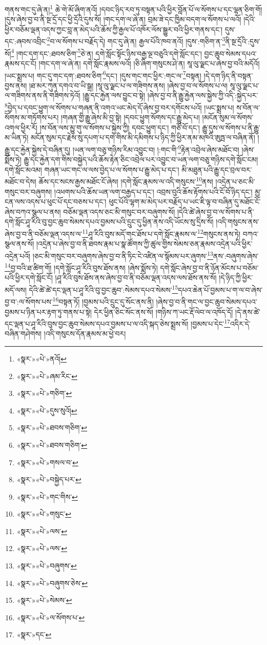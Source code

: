 གནས་གང་དུ་ཞེ་ན།\footnote{«སྣར་»«པེ་»ནའོ།} ཆེ་གེ་མོ་ཞིག་ནའོ། །དབང་ཉིད་རབ་ཏུ་བསྟན་པའི་ཕྱིར་བློན་པོ་ལ་སོགས་པ་དང་ལྷན་ཅིག་གོ། །དུས་ཞེས་བྱ་བ་ནི་སྔ་དྲོ་དང་ཕྱི་དྲོའི་དུས་སོ། །གང་དག་ལ་ཞེ་ན། བྲམ་ཟེ་དང་ཁྱིམ་བདག་ལ་སོགས་པ་ལའོ། །དེའི་ཕྱིར་བཅོམ་ལྡན་འདས་ཀྱང་བླ་ན་མེད་པའི་ཆོས་ཀྱི་རྒྱལ་པོ་འཁོར་ལོས་སྒྱུར་བའི་ཕྱིར་གནས་དང་། དུས་དང་:ཞབས་འབྲིང་\footnote{«སྣར་»«པེ་»ཞམ་རིང་}བ་ལ་སོགས་པ་བརྗོད་དེ། གང་དུ་ཞེ་ན། རྒྱལ་པོའི་ཁབ་ནའོ། །དུས་:གཅིག་ན་\footnote{«སྣར་»«པེ་»གཅིག་}ནི་སྔ་དྲོའི་:དུས་སོ།\footnote{«སྣར་»«པེ་»དུས་སུའོ།} །གང་དག་དང་:ཐབས་ཅིག་\footnote{«སྣར་»«པེ་»ཐབས་གཅིག་}ཅེ་ན། དགེ་སློང་སྟོང་ཉིས་བརྒྱ་ལྔ་བཅུའི་དགེ་སློང་དང་། བྱང་ཆུབ་སེམས་དཔའ་རྣམས་དང་ངོ། །གང་དག་ལ་ཞེ་ན། དགེ་སློང་རྣམས་ལའོ། །ཅི་ཞིག་གསུངས་ཤེ་ན། སཱ་ལུ་ལྗང་པ་ཞེས་བྱ་བའི་མདོའོ། །ཡང་སྨྲས་པ། གང་དུ་གང་དག་:ཐབས་ཅིག་\footnote{«སྣར་»«པེ་»ཐབས་གཅིག་}དང་། །དུས་གང་གང་ཕྱིར་:གང་ལ་\footnote{«སྣར་»«པེ་»གསལ་བ་}བསྟན། །དེ་དག་ཉིད་ནི་བསྟན་བྱས་ནས། །ཐ་མར་ཀུན་དགའ་བ་ཡི་སྒྲ། །སཱ་ལུ་ལྗང་པ་ལ་གཟིགས་ནས། །ཞེས་བྱ་བ་ལ་སོགས་པ་ལ། སཱ་ལུ་ལྗང་པ་ལ་གཟིགས་ནས་ནི་གཟིགས་ཏེའོ། །རྒྱུ་དང་རྐྱེན་ལས་བྱུང་བ་སྟེ། །ཞེས་བྱ་བ་ནི་རྒྱུ་རྐྱེན་ལས་སྐྱེས་ཀྱི་འདི་:སྐྱེད་པར་\footnote{«སྣར་»«པེ་»བསྐྱེད་པར་}བྱེད་པ་དབང་ཕྱུག་ལ་སོགས་པ་གཞན་ནི་འགའ་ཡང་མེད་དོ་ཞེས་བྱ་བར་དགོངས་པའོ། །ཡང་སྨྲས་པ། ས་བོན་ལ་སོགས་མ་གཏོགས་པར། །གཞན་གྱི་རྒྱུ་ཞེས་མི་བྱ་སྟེ། །དབང་ཕྱུག་སོགས་དང་རྒྱུ་མེད་པ། །མངོན་སུམ་ལ་སོགས་འགལ་ཕྱིར་རོ། །ས་བོན་ལས་མྱུ་གུ་ལ་སོགས་པ་སྐྱེས་ཀྱི། དབང་ཕྱུག་དང་། གཙོ་བོ་དང་། རྒྱུ་དུས་ལ་སོགས་པ་ནི་རྒྱུ་མ་ཡིན་ཏེ། མངོན་སུམ་དང་རྗེས་སུ་དཔག་པ་དག་གིས་མི་དམིགས་པ་ཉིད་ཀྱི་ཕྱིར་ནམ་མཁའི་ཨུཏྤ་ལ་བཞིན་ནོ། །རྒྱུ་དང་རྐྱེན་སྐྱེས་དེ་བཞིན་དུ། །ཡན་ལག་བཅུ་གཉིས་རིམ་འབྱུང་བ། །:གང་གི་\footnote{«སྣར་»«པེ་»གང་གིས་}རྟེན་འབྲེལ་ཞེས་མཐོང་བ། །ཞེས་སྨོས་ཏེ། རྒྱུ་དང་རྐྱེན་དག་གིས་བསྐྱེད་པའི་ཆོས་རྟེན་ཅིང་འབྲེལ་པར་འབྱུང་བ་ཡན་ལག་བཅུ་གཉིས་དགེ་སློང་ངམ། དགེ་སློང་མའམ། གཞན་ཡང་གང་ལ་ལས་བྱེད་པ་ལ་སོགས་པ་རྒྱུ་མེད་པ་དང་། མི་མཐུན་པའི་རྒྱུ་དང་བྲལ་བར་མཐོང་བ་དེས། ཆོས་དང་སངས་རྒྱས་མཐོང་ངོ་ཞེས། །དགེ་སློང་རྣམས་ལ་འདི་གསུངས་\footnote{«སྣར་»«པེ་»གསུང་}ནས། །འདྲེན་པ་ཅང་མི་གསུང་བར་བཞུགས། །འཕགས་པའི་ཆོས་ཡན་ལག་བརྒྱད་པ་དང་། འབྲས་བུའི་ཆོས་རྟོགས་པའི་ངོ་བོ་ཉིད་དང་། མྱ་ངན་ལས་འདས་པ་ཕུང་པོ་དང་བཅས་པ་དང་། ཕུང་པོའི་ལྷག་མ་མེད་པར་བརྗོད་པ་ཡང་ཇི་ལྟ་བ་བཞིན་དུ་མཐོང་ངོ་ཞེས་བཀའ་སྩལ་པ་ནས། བཅོམ་ལྡན་འདས་ཅང་མི་གསུང་བར་བཞུགས་སོ། །དེའི་ཚེ་ཞེས་བྱ་བ་ལ་སོགས་པ་ནི་དགེ་སློང་ཤཱ་རིའི་བུ་བྱང་ཆུབ་སེམས་དཔའ་བྱམས་པའི་དྲུང་དུ་ཕྱིན་ནས་འདི་ཡོངས་སུ་དྲིས་སོ། །འདི་གསུངས་ནས་ཞེས་བྱ་བ་ནི་བཅོམ་ལྡན་འདས་ལ་\footnote{«སྣར་»«པེ་»ལས་}ཤཱ་རིའི་བུས་མདོ་གང་ཐོས་པ་དགེ་སློང་རྣམས་ལ་\footnote{«སྣར་»«པེ་»ལས་}གསུངས་ནས་ཏེ། བཀའ་སྩལ་ནས་སོ། །འདྲེན་པ་ཞེས་བྱ་བ་ནི་ཐབས་རྣམ་པ་སྣ་ཚོགས་ཀྱི་ཚུལ་གྱིས་སེམས་ཅན་རྣམས་འདྲེན་པའི་ཕྱིར་འདྲེན་པའོ། །ཅང་མི་གསུང་བར་བཞུགས་ཞེས་བྱ་བ་ནི་ཏིང་ངེ་འཛིན་ལ་སྙོམས་པར་ཞུགས་\footnote{«སྣར་»«པེ་»བཞུགས་}ནས་:བཞུགས་ཞེས་\footnote{«སྣར་»«པེ་»བཞུགས་ཅེས་}བྱ་བའི་ཐ་ཚིག་གོ། །དགེ་སློང་ཤཱ་རིའི་བུས་ཐོས་ནས། །ཞེས་སྨོས་ཏེ། དགེ་སློང་ཞེས་བྱ་བ་ནི་ཉོན་མོངས་པ་བཅོམ་པའི་ཕྱིར་དགེ་སློང་ངོ། །ཤཱ་རིའི་བུས་ཐོས་ནས་ཞེས་བྱ་བ་ནི་བཅོམ་ལྡན་འདས་ལས་ཐོས་ནས་སོ། །དེ་ཉིད་ཀྱི་ཕྱིར་མདོ་ལས། དེའི་ཚེ་ཚེ་དང་ལྡན་པ་ཤཱ་རིའི་བུ་བྱང་ཆུབ་:སེམས་དཔའ་སེམས་\footnote{«སྣར་»«པེ་»སེམས་}དཔའ་ཆེན་པོ་བྱམས་པ་ག་ལ་བ་ཞེས་བྱ་བ་:ལ་སོགས་པས་\footnote{«སྣར་»«པེ་»ལ་སོགས་པ་}བསྟན་ཏོ། །བྱམས་པའི་དྲུང་དུ་སོང་ནས་ནི། །ཞེས་བྱ་བ་ནི་གང་ལ་བྱང་ཆུབ་སེམས་དཔའ་བྱམས་པ་ཉིན་པར་རྟག་ཏུ་གནས་པ་སྟེ། དེར་ཕྱིན་ཅིང་སོང་ནས་སོ། །གཉིས་ཀ་ཡང་རྡོ་ལེབ་ལ་འཁོད་དོ། །དེ་ནས་ཚེ་དང་ལྡན་པ་ཤཱ་རིའི་བུས་བྱང་ཆུབ་སེམས་དཔའ་བྱམས་པ་ལ་འདི་སྐད་ཅེས་སྨྲས་སོ། །བྱམས་པ་དེང་\footnote{«སྣར་»དང་}འདིར་དེ་བཞིན་གཤེགས། །འདི་གསུངས་དོན་རྣམས་མ་ཕྱེ་བར། 
